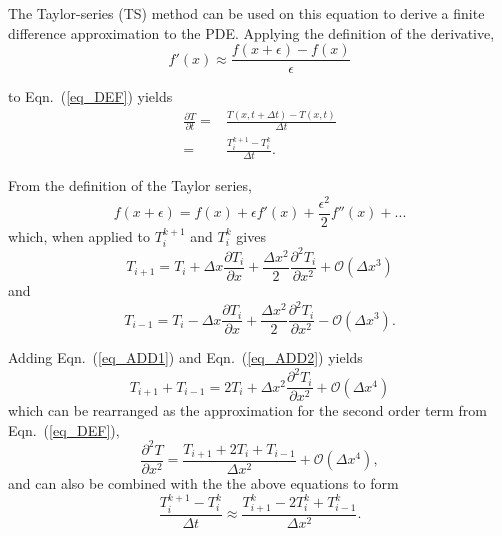 \documentclass[twocolumn,10pt]{asme2ej}
\begin{document}
The Taylor-series (TS) method can be used on this equation to derive a finite difference approximation to the PDE. Applying the definition of the derivative,
\begin{equation}
f'(x) \approx \frac{f(x + \epsilon) - f(x)}{\epsilon}
\end{equation}

\noindent to Eqn.~(\ref{eq_DEF}) yields
\begin{equation}
\begin{split}
\frac{\partial T}{\partial t} = & \frac{T(x, t + \Delta t) - T(x,t)}{\Delta t} \\
				      = & \frac{T_{i}^{k+1} - T_{i}^{k}}{\Delta t}.
\end{split}
\end{equation}

From the definition of the Taylor series,
\begin{equation}
f(x+\epsilon) = f(x) + \epsilon f'(x) + \frac{\epsilon^2}{2} f''(x) + ...
\end{equation}
\noindent which, when applied to $T_{i}^{k+1}$  and $T_{i}^{k}$ gives
\begin{equation}
T_{i+1} = T_i + \Delta x \frac{\partial T_i}{\partial x} + \frac{\Delta x^2}{2} \frac{\partial^2 T_i}{\partial x^2} + \mathcal{O}(\Delta x^3)
\label{eq_ADD1}
\end{equation}
\noindent and
\begin{equation}
T_{i-1} = T_i - \Delta x \frac{\partial T_i}{\partial x} + \frac{\Delta x^2}{2} \frac{\partial^2 T_i}{\partial x^2} - \mathcal{O}(\Delta x^3).
\label{eq_ADD2}
\end{equation}

Adding Eqn.~(\ref{eq_ADD1}) and Eqn.~(\ref{eq_ADD2}) yields
\begin{equation}
T_{i+1} + T_{i-1} = 2T_i + \Delta x^2 \frac{\partial^2 T_i}{\partial x^2} + \mathcal{O}(\Delta x^4)
\end{equation}
\noindent which can be rearranged as the approximation for the second order term from Eqn.~(\ref{eq_DEF}),
\begin{equation}
\frac{\partial^2 T}{\partial x^2} = \frac{T_{i+1} + 2T_{i} + T_{i-1}}{\Delta x^2} + \mathcal{O}(\Delta x^4),
\end{equation}
\noindent and can also be combined with the the above equations to form
\begin{equation}
\frac{T_i^{k+1}-T_i^k}{\Delta t} \approx \frac{T_{i+1}^k - 2T_i^k + T_{i-1}^k}{\Delta x^2}.
\label{eq_SEMIFINAL}
\end{equation}
\end{document}
